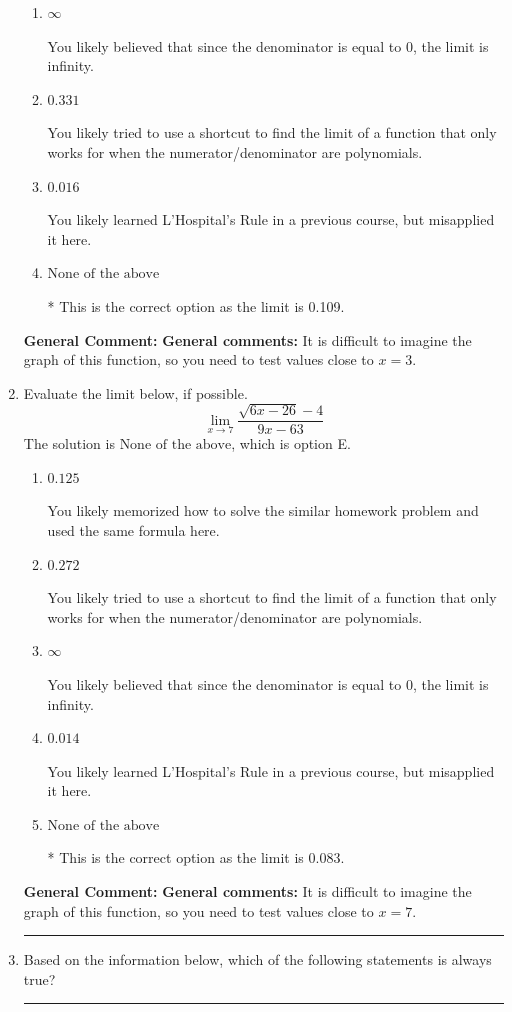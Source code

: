 \documentclass{extbook}[14pt]
\newcommand{\litem}[1]{\item #1

\rule{\textwidth}{0.4pt}}
\begin{document}
\begin{enumerate}
{\begin{enumerate}[label=\Alph*.]
You likely memorized how to solve the similar homework problem and used the same formula here.
\item \( \infty \)

You likely believed that since the denominator is equal to 0, the limit is infinity.
\item \( 0.331 \)

You likely tried to use a shortcut to find the limit of a function that only works for when the numerator/denominator are polynomials.
\item \( 0.016 \)

You likely learned L'Hospital's Rule in a previous course, but misapplied it here.
\item \( \text{None of the above} \)

* This is the correct option as the limit is 0.109.
\end{enumerate}

\textbf{General Comment:} \textbf{General comments:} It is difficult to imagine the graph of this function, so you need to test values close to $x = 3$.
}
\litem{
Evaluate the limit below, if possible.
\[ \lim_{x \rightarrow 7} \frac{\sqrt{6x - 26} - 4}{9x - 63} \]The solution is \( \text{None of the above} \), which is option E.\begin{enumerate}[label=\Alph*.]
\item \( 0.125 \)

You likely memorized how to solve the similar homework problem and used the same formula here.
\item \( 0.272 \)

You likely tried to use a shortcut to find the limit of a function that only works for when the numerator/denominator are polynomials.
\item \( \infty \)

You likely believed that since the denominator is equal to 0, the limit is infinity.
\item \( 0.014 \)

You likely learned L'Hospital's Rule in a previous course, but misapplied it here.
\item \( \text{None of the above} \)

* This is the correct option as the limit is 0.083.
\end{enumerate}

\textbf{General Comment:} \textbf{General comments:} It is difficult to imagine the graph of this function, so you need to test values close to $x = 7$.
}
\litem{
Based on the information below, which of the following statements is always true?

}
\end{enumerate}
\end{document}
